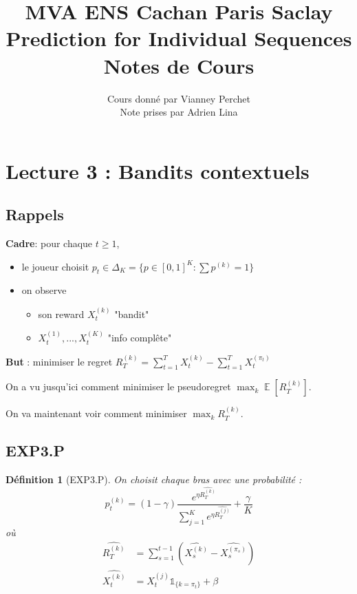 \documentclass{article}
\DeclareMathOperator*{\E}{\mathbb{E}}
\newtheorem{definition}{Définition}[section]
\theoremstyle{remark}
\theoremstyle{remark}
\begin{document}
\title{%
  \large MVA ENS Cachan Paris Saclay \\
  \huge Prediction for Individual Sequences\\ Notes de Cours \\
}
\author{%
  Cours donné par Vianney Perchet \\
  Note prises par Adrien Lina
}

\maketitle

\section{Lecture 3 : Bandits contextuels}

\subsection{Rappels}

\textbf{Cadre}: pour chaque $t \geq 1$,
\begin{itemize}
   \item le joueur choisit $p_t \in \Delta_K = \{p \in [0,1]^K : \sum p^{(k)} = 1\}$
   \item on observe
   \begin{itemize}
      \item son reward $X_t^{(k)}$ "bandit"
      \item $X_t^{(1)}, ..., X_t^{(K)}$ "info complête"
   \end{itemize}
\end{itemize}

\textbf{But} : minimiser le regret $R_T^{(k)} = \sum_{t=1}^T X_t^{(k)} - \sum_{t=1}^T X_t^{(\pi_t)}$

On a vu jusqu'ici comment minimiser le pseudoregret $\max_k \E[R_T^{(k)}]$.

On va maintenant voir comment minimiser $\max_k R_T^{(k)}$.

\subsection{EXP3.P}

\begin{definition}[EXP3.P]
   On choisit chaque bras avec une probabilité :
   $$
   p_t^{(k)} = (1-\gamma) \frac{e^{\eta \widehat{R_T^{(k)}}}}{\sum\limits_{j=1}^Ke^{\eta \widehat{R_T^{(j)}}}} + \frac{\gamma}{K}
   $$
   où
   \begin{align*}
      \widehat{R_T^{(k)}} &= \sum_{s=1}^{t-1} \left( \widehat{X_s^{(k)}} - \widehat{X_s^{(\pi_s)}} \right) \\
      \widehat{X_t^{(k)}} &= X_t^{(j)} \mathbb{1}_{\{k = \pi_t\}} + \beta
   \end{align*}
\end{definition}
\end{document}
